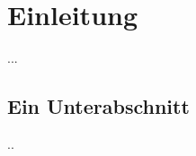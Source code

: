\section{Einleitung}
\label{sec:einleitung}

...

\subsection{Ein Unterabschnitt}
\label{sec:einleitung:unterabschnitt}


..
